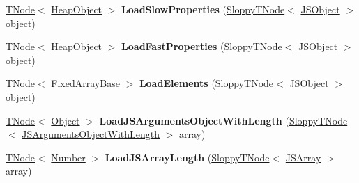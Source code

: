 \begin{DoxyCompactItemize}
\mbox{\hyperlink{classv8_1_1internal_1_1compiler_1_1TNode}{T\+Node}}$<$ \mbox{\hyperlink{classv8_1_1internal_1_1HeapObject}{Heap\+Object}} $>$ {\bfseries Load\+Slow\+Properties} (\mbox{\hyperlink{classv8_1_1internal_1_1compiler_1_1SloppyTNode}{Sloppy\+T\+Node}}$<$ \mbox{\hyperlink{classv8_1_1internal_1_1JSObject}{J\+S\+Object}} $>$ object)
\item 
\mbox{\label{classv8_1_1internal_1_1CodeStubAssembler_a4b35a0ece95f31660ea1d30c72ce7707}} 
\mbox{\hyperlink{classv8_1_1internal_1_1compiler_1_1TNode}{T\+Node}}$<$ \mbox{\hyperlink{classv8_1_1internal_1_1HeapObject}{Heap\+Object}} $>$ {\bfseries Load\+Fast\+Properties} (\mbox{\hyperlink{classv8_1_1internal_1_1compiler_1_1SloppyTNode}{Sloppy\+T\+Node}}$<$ \mbox{\hyperlink{classv8_1_1internal_1_1JSObject}{J\+S\+Object}} $>$ object)
\item 
\mbox{\label{classv8_1_1internal_1_1CodeStubAssembler_aa71575c3fe69cad64a330504358b5e24}} 
\mbox{\hyperlink{classv8_1_1internal_1_1compiler_1_1TNode}{T\+Node}}$<$ \mbox{\hyperlink{classv8_1_1internal_1_1FixedArrayBase}{Fixed\+Array\+Base}} $>$ {\bfseries Load\+Elements} (\mbox{\hyperlink{classv8_1_1internal_1_1compiler_1_1SloppyTNode}{Sloppy\+T\+Node}}$<$ \mbox{\hyperlink{classv8_1_1internal_1_1JSObject}{J\+S\+Object}} $>$ object)
\item 
\mbox{\label{classv8_1_1internal_1_1CodeStubAssembler_a6452704d0c118d2c9a0063e580818c47}} 
\mbox{\hyperlink{classv8_1_1internal_1_1compiler_1_1TNode}{T\+Node}}$<$ \mbox{\hyperlink{classv8_1_1internal_1_1Object}{Object}} $>$ {\bfseries Load\+J\+S\+Arguments\+Object\+With\+Length} (\mbox{\hyperlink{classv8_1_1internal_1_1compiler_1_1SloppyTNode}{Sloppy\+T\+Node}}$<$ \mbox{\hyperlink{classv8_1_1internal_1_1JSArgumentsObjectWithLength}{J\+S\+Arguments\+Object\+With\+Length}} $>$ array)
\item 
\mbox{\label{classv8_1_1internal_1_1CodeStubAssembler_ac3dfb6c1f66a43f7597d2447f29da910}} 
\mbox{\hyperlink{classv8_1_1internal_1_1compiler_1_1TNode}{T\+Node}}$<$ \mbox{\hyperlink{structv8_1_1internal_1_1UnionT}{Number}} $>$ {\bfseries Load\+J\+S\+Array\+Length} (\mbox{\hyperlink{classv8_1_1internal_1_1compiler_1_1SloppyTNode}{Sloppy\+T\+Node}}$<$ \mbox{\hyperlink{classv8_1_1internal_1_1JSArray}{J\+S\+Array}} $>$ array)

\end{DoxyCompactItemize}
